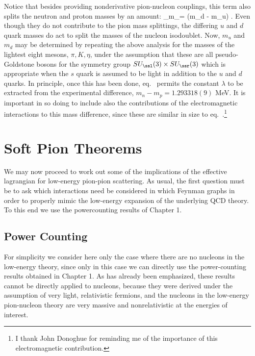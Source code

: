 \documentclass[12pt]{report}
\begin{document}
Notice that besides providing nonderivative pion-nucleon
couplings, this term also splits the neutron and proton
masses by an amount: 
%
\eq
\label{npmassdiff}
\delta_\lambda m_\ssn = \lambda (m_d - m_u) .
\eeq
%
Even though they do not contribute to the 
pion mass splittings, the differing $u$ and $d$ quark 
masses do act to split the masses of the
nucleon isodoublet. Now, $m_u$ and $m_d$
may be determined by repeating the above analysis for the
masses of the lightest eight mesons, 
$\pi, K, \eta$, under the assumption that these are all
pseudo-Goldstone bosons for the symmetry group $SU_\ssl(3)
\times SU_\ssr(3)$ which is appropriate when the $s$ quark
is assumed to be light in addition to the $u$ and $d$
quarks. In principle, once this has been done, 
eq.~
permits the constant $\lambda$ to be extracted from
the experimental difference, $m_n - m_p = 
1.293318(9)$ MeV. It is important in so doing to 
include also the contributions of the electromagnetic 
interactions to this mass difference, since these are
similar in size to eq.~.\footnote{I 
thank John Donoghue
for reminding me of the importance of this electromagnetic
contribution.}

\section{Soft Pion Theorems}

We may now proceed to work out some of the implications of
the effective lagrangian for low-energy pion-pion
scattering. As usual, the first question must be to ask
which interactions need be considered in which Feynman
graphs in order to properly mimic the low-energy expansion
of the underlying QCD theory. To this end we use the
powercounting results of Chapter 1.

\subsection{Power Counting}

For simplicity we consider here only the case where there
are no nucleons in the low-energy theory, since only in this
case we can directly use the power-counting results
obtained in Chapter 1. As has already been emphasized, 
these results cannot be directly applied to nucleons, 
because they were derived under the
assumption of very light, relativistic fermions, and the
nucleons in the low-energy pion-nucleon theory are very
massive and nonrelativistic at the energies of interest.
\end{document}
